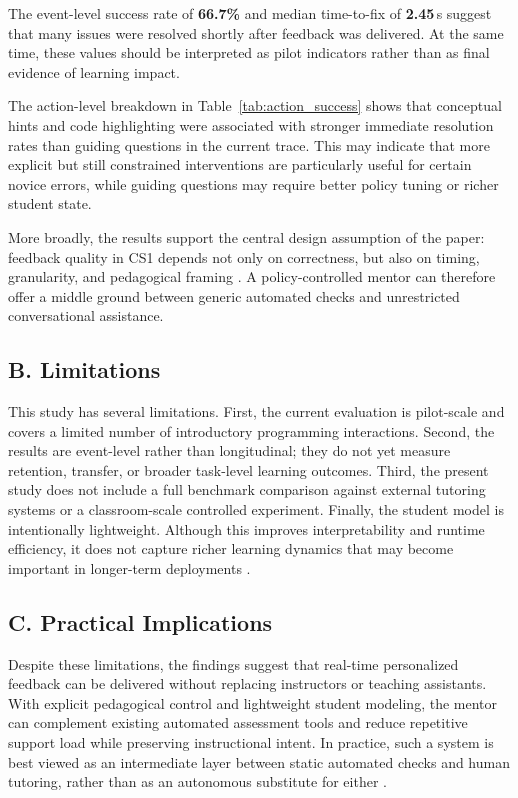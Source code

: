 \documentclass[conference]{IEEEtran}
\begin{document}
The event-level success rate of \textbf{66.7\%} and median time-to-fix of \textbf{2.45}\,s suggest that many issues were resolved shortly after feedback was delivered. At the same time, these values should be interpreted as pilot indicators rather than as final evidence of learning impact.

The action-level breakdown in Table~\ref{tab:action_success} shows that conceptual hints and code highlighting were associated with stronger immediate resolution rates than guiding questions in the current trace. This may indicate that more explicit but still constrained interventions are particularly useful for certain novice errors, while guiding questions may require better policy tuning or richer student state.

More broadly, the results support the central design assumption of the paper: feedback quality in CS1 depends not only on correctness, but also on timing, granularity, and pedagogical framing \cite{SystematicLiteratureReviewonLLM,DesirableCharacteristicsforAITeachingAssistantsinProgrammingEducation}. A policy-controlled mentor can therefore offer a middle ground between generic automated checks and unrestricted conversational assistance.

\subsection*{B. Limitations}

This study has several limitations. First, the current evaluation is pilot-scale and covers a limited number of introductory programming interactions. Second, the results are event-level rather than longitudinal; they do not yet measure retention, transfer, or broader task-level learning outcomes. Third, the present study does not include a full benchmark comparison against external tutoring systems or a classroom-scale controlled experiment. Finally, the student model is intentionally lightweight. Although this improves interpretability and runtime efficiency, it does not capture richer learning dynamics that may become important in longer-term deployments \cite{ProgTutor,AIEnabledIntelligentAssistant}.

\subsection*{C. Practical Implications}

Despite these limitations, the findings suggest that real-time personalized feedback can be delivered without replacing instructors or teaching assistants. With explicit pedagogical control and lightweight student modeling, the mentor can complement existing automated assessment tools and reduce repetitive support load while preserving instructional intent. In practice, such a system is best viewed as an intermediate layer between static automated checks and human tutoring, rather than as an autonomous substitute for either \cite{CodeAid,ImprovingAIinCS50}.
\end{document}
